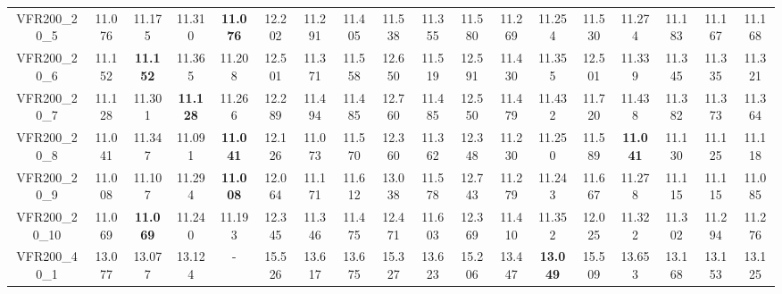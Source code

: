 \begin{tabular}{cc|ccc|ccccccccccccc}
VFR200\_20\_5      & 11.076           & 11.175           & 11.310           & {\bf 11.076}     & 12.202           & 11.291           & 11.405           & 11.538           & 11.355           & 11.580           & 11.269           & 11.254           & 11.530           & 11.274           & 11.183           & 11.167           & 11.168          \\ 
VFR200\_20\_6      & 11.152           & {\bf 11.152}     & 11.365           & 11.208           & 12.501           & 11.371           & 11.558           & 12.650           & 11.519           & 12.591           & 11.430           & 11.355           & 12.501           & 11.339           & 11.345           & 11.335           & 11.321          \\ 
VFR200\_20\_7      & 11.128           & 11.301           & {\bf 11.128}     & 11.266           & 12.289           & 11.494           & 11.485           & 12.760           & 11.485           & 12.550           & 11.479           & 11.432           & 11.720           & 11.438           & 11.382           & 11.373           & 11.364          \\ 
VFR200\_20\_8      & 11.041           & 11.347           & 11.091           & {\bf 11.041}     & 12.126           & 11.073           & 11.570           & 12.360           & 11.362           & 12.348           & 11.230           & 11.250           & 11.589           & {\bf 11.041}     & 11.130           & 11.125           & 11.118          \\ 
VFR200\_20\_9      & 11.008           & 11.107           & 11.294           & {\bf 11.008}     & 12.064           & 11.171           & 11.612           & 13.038           & 11.578           & 12.743           & 11.279           & 11.243           & 11.667           & 11.278           & 11.115           & 11.115           & 11.085          \\ 
VFR200\_20\_10     & 11.069           & {\bf 11.069}     & 11.240           & 11.193           & 12.345           & 11.346           & 11.475           & 12.471           & 11.603           & 12.369           & 11.410           & 11.352           & 12.025           & 11.322           & 11.302           & 11.294           & 11.276          \\ 
VFR200\_40\_1      & 13.077           & 13.077           & 13.124           & -                & 15.526           & 13.617           & 13.675           & 15.327           & 13.623           & 15.206           & 13.447           & {\bf 13.049}     & 15.509           & 13.653           & 13.168           & 13.153           & 13.125          \\ 

\end{tabular}
